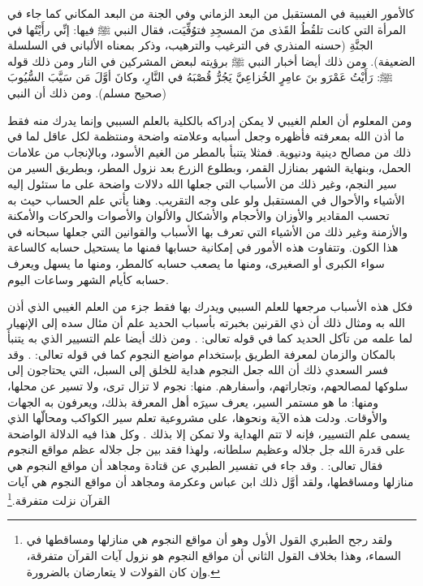 كالأمور الغيبية في المستقبل من البعد الزماني وفي الجنة من البعد المكاني كما جاء في المرأة التي كانت تلقُطُ القَذى منَ المسجِدِ فتوُفِّيَت، فقال النبي ﷺ فيها: إنِّي رأَيْتُها في الجنَّةِ {\footnotesize (حسنه المنذري في الترغيب والترهيب، وذكر بمعناه الألباني في السلسلة الضعيفة)}. ومن ذلك أيضا أخبار النبي ﷺ برؤيته لبعض المشركين في النار ومن ذلك قوله ﷺ: رَأَيْتُ عَمْرَو بنَ عامِرٍ الخُزاعِيَّ يَجُرُّ قُصْبَهُ في النَّارِ، وكانَ أوَّلَ مَن سَيَّبَ السُّيُوبَ {\footnotesize (صحيح مسلم)}. 
ومن ذلك أن النبي 



ومن المعلوم أن العلم الغيبي لا يمكن إدراكه بالكلية بالعلم السببي وإنما يدرك منه فقط ما أذن الله بمعرفته فأظهره وجعل أسبابه وعلامته واضحة ومنتظمة لكل عاقل لما في ذلك من مصالح دينية ودنيوية. فمثلا يتنبأ بالمطر من الغيم الأسود، وبالإنجاب من علامات الحمل، وبنهاية الشهر بمنازل القمر، وبطلوع الزرع بعد نزول المطر، وبطريق السير من سير النجم، وغير ذلك من الأسباب التي جعلها الله دلالات واضحة على ما ستئول إليه الأشياء والأحوال في المستقبل ولو على وجه التقريب. وهنا يأتي علم الحساب حيث به تحسب المقادير والأوزان والأحجام والأشكال والألوان والأصوات والحركات والأمكنة والأزمنة وغير ذلك من الأشياء التي تعرف بها الأسباب والقوانين التي جعلها سبحانه في هذا الكون. وتتفاوت هذه الأمور في إمكانية حسابها فمنها ما يستحيل حسابه كالساعة سواء الكبرى أو الصغيرى، ومنها ما يصعب حسابه كالمطر، ومنها ما يسهل ويعرف حسابه كأيام الشهر وساعات اليوم. 

فكل هذه الأسباب مرجعها للعلم السببي ويدرك بها فقط جزء من العلم الغيبي الذي أذن الله به ومثال ذلك أن ذي القرنين بخبرته بأسباب الحديد علم أن مئال سده إلى الإنهيار لما علمه من تآكل الحديد كما في قوله تعالى: 
\quranayah*[18][98]{\footnotesize \surahname*[18]}. ومن ذلك أيضا علم التسيير الذي به يتنبأ بالمكان والزمان لمعرفة الطريق بإستخدام مواضع النجوم كما في قوله تعالى: 
\quranayah*[6][97]{\footnotesize \surahname*[6]}. وقد فسر السعدي ذلك أن الله جعل النجوم هداية للخلق إلى السبل، التي يحتاجون إلى سلوكها لمصالحهم، وتجاراتهم، وأسفارهم. منها: نجوم لا تزال ترى، ولا تسير عن محلها، ومنها: ما هو مستمر السير، يعرف سيرَه أهل المعرفة بذلك، ويعرفون به الجهات والأوقات. ودلت هذه الآية ونحوها، على مشروعية تعلم سير الكواكب ومحالّها الذي يسمى علم التسيير، فإنه لا تتم الهداية ولا تمكن إلا بذلك \cite{tafsir_Saadi}. وكل هذا فيه الدلالة الواضحة على قدرة الله جل جلاله وعظيم سلطانه، ولهذا فقد بين جل جلاله عظم مواقع النجوم فقال تعالى:  
\quranayah*[56][75-76]{\footnotesize \surahname*[56]}. وقد جاء في تفسير الطبري عن قتادة ومجاهد أن مواقع النجوم هي منازلها ومساقطها، ولقد أوَّل ذلك ابن عباس وعكرمة ومجاهد أن مواقع النجوم هي آيات القرآن نزلت متفرقة.\footnote{ولقد رجح الطبري القول الأول وهو أن مواقع النجوم هي منازلها ومساقطها في السماء، وهذا بخلاف القول الثاني أن مواقع النجوم هو نزول آيات القرآن متفرقة، وإن كان القولات لا يتعارضان بالضرورة.}

